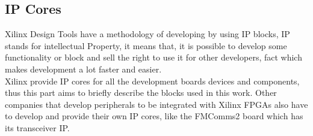 \subsection{IP Cores}

Xilinx Design Tools have a methodology of developing by using IP blocks, IP
stands for intellectual Property, it means that, it is possible to develop some
functionality or block and sell the right to use it for other developers, fact
which makes development a lot faster and easier.\\

Xilinx provide IP cores for all the development boards devices and components,
thus this part aims to briefly describe the blocks used in this work. Other
companies that develop peripherals to be integrated with Xilinx FPGAs also have
to develop and provide their own IP cores, like the FMComms2 board which has its
transceiver IP.


